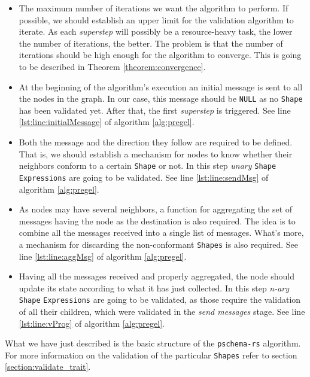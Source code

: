 \begin{itemize}
    \itemsep0.5em
    \item The maximum number of iterations we want the algorithm to perform. If possible, we should establish an upper limit for the validation algorithm to iterate. As each \textit{superstep} will possibly be a resource-heavy task, the lower the number of iterations, the better. The problem is that the number of iterations should be high enough for the algorithm to converge. This is going to be described in Theorem \ref{theorem:convergence}.
    \item At the beginning of the algorithm's execution an initial message is sent to all the nodes in the graph. In our case, this message should be \texttt{NULL} as no \texttt{Shape} has been validated yet. After that, the first \textit{superstep} is triggered. See line \ref{lst:line:initialMessage} of algorithm \ref{alg:pregel}.
    \item Both the message and the direction they follow are required to be defined. That is, we should establish a mechanism for nodes to know whether their neighbors conform to a certain \texttt{Shape} or not. In this step \textit{unary} \texttt{Shape} \texttt{Expressions} are going to be validated. See line \ref{lst:line:sendMsg} of algorithm \ref{alg:pregel}.
    \item As nodes may have several neighbors, a function for aggregating the set of messages having the node as the destination is also required. The idea is to combine all the messages received into a single list of messages. What's more, a mechanism for discarding the non-conformant \texttt{Shapes} is also required. See line \ref{lst:line:aggMsg} of algorithm \ref{alg:pregel}.
    \item Having all the messages received and properly aggregated, the node should update its state according to what it has just collected. In this step \textit{n-ary} \texttt{Shape} \texttt{Expressions} are going to be validated, as those require the validation of all their children, which were validated in the \textit{send messages} stage. See line \ref{lst:line:vProg} of algorithm \ref{alg:pregel}.
\end{itemize}

What we have just described is the basic structure of the \texttt{pschema-rs} algorithm. For more information on the validation of the particular \texttt{Shapes} refer to section \ref{section:validate_trait}.

\label{alg:pregel}
\begin{pseudocode}
    
\end{pseudocode}

